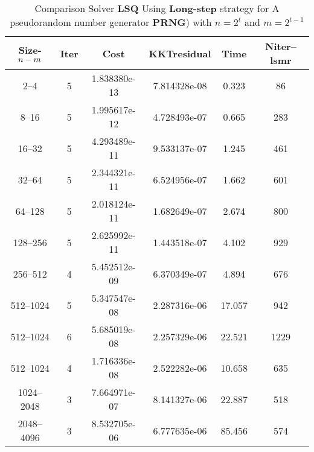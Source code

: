 \documentclass[letterpaper,12pt,oneside,final]{book}
\begin{document}
\begin{table}
\caption{Comparison Solver {\bf LSQ} Using  {\bf Long-step} strategy for  A pseudorandom number generator {\bf PRNG}) with $n=2^{t}$ and $m=2^{t-1}$}  
\begin{center}
\begin{tabular}{|*{6}{c}|} \hline
Size-$n\--m$ & \multicolumn{1}{c}{Iter} & \multicolumn{1}{c}{Cost}& \multicolumn{1}{c}{KKTresidual} & \multicolumn{1}{c}{Time} & \multicolumn{1}{c|}{Niter--lsmr} \\ 
\hline
2--4 &      5    &       1.838380e-13&   7.814328e-08&   0.323&   86   \\       
8--16&      5    &       1.995617e-12&   4.728493e-07&   0.665&   283  \\       
16--32&      5    &       4.293489e-11&   9.533137e-07&   1.245&   461  \\       
32--64&      5    &       2.344321e-11&   6.524956e-07&   1.662&   601  \\       
64--128&      5    &       2.018124e-11&   1.682649e-07&   2.674&   800  \\       
128--256&      5    &       2.625992e-11&   1.443518e-07&   4.102&   929  \\       
256--512&      4    &       5.452512e-09&   6.370349e-07&   4.894&   676  \\       
512--1024&      5    &       5.347547e-08&   2.287316e-06&   17.057&   942  \\       
512--1024&      6    &       5.685019e-08&   2.257329e-06&   22.521&   1229 \\       
512--1024&      4    &       1.716336e-08&   2.522282e-06&   10.658&   635  \\       
1024--2048&      3    &       7.664971e-07&   8.141327e-06&   22.887&   518  \\       
2048--4096&      3    &       8.532705e-06&   6.777635e-06&   85.456&   574  \\ 


\hline
\end{tabular}
\end{center}
\end{table}
\end{document}
